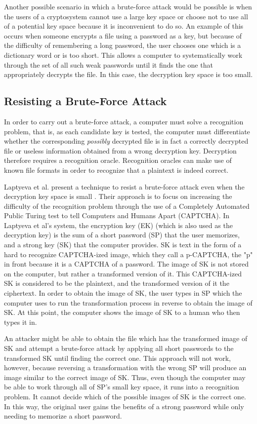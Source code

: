 \documentclass[12pt]{article}
\begin{document}
Another possible scenario in which a brute-force attack would be possible is when the users of a cryptosystem cannot use a large key space or choose not to use all of a potential key space because it is inconvenient to do so. An example of this occurs when someone encrypts a file using a password as a key, but because of the difficulty of remembering a long password, the user chooses one which is a dictionary word or is too short. This allows a computer to systematically work through the set of all such weak passwords until it finds the one that appropriately decrypts the file. In this case, the decryption key space is too small.

\subsection*{Resisting a Brute-Force Attack}
In order to carry out a brute-force attack, a computer must solve a recognition problem, that is, as each candidate key is tested, the computer must differentiate whether the corresponding \emph{possibly} decrypted file is in fact a correctly decrypted file or useless information obtained from a wrong decryption key. Decryption therefore requires a recognition oracle. Recognition oracles can make use of known file formats in order to recognize that a plaintext is indeed correct.

Laptyeva et al. present a technique to resist a brute-force attack even when the decryption key space is small \cite{laptyeva}. Their approach is to focus on increasing the difficulty of the recognition problem through the use of a Completely Automated Public Turing test to tell Computers and Humans Apart (CAPTCHA). In Laptyeva et al's system, the encryption key (EK) (which is also used as the decryption key) is the sum of a short password (SP) that the user memorizes, and a strong key (SK) that the computer provides. SK is text in the form of a hard to recognize CAPTCHA-ized image, which they call a p-CAPTCHA, the "p" in front because it is a CAPTCHA of a password. The image of SK is not stored on the computer, but rather a transformed version of it. This CAPTCHA-ized SK is considered to be the plaintext, and the transformed version of it the ciphertext. In order to obtain the image of SK, the user types in SP which the computer uses to run the transformation process in reverse to obtain the image of SK. At this point, the computer shows the image of SK to a human who then types it in.

An attacker might be able to obtain the file which has the transformed image of SK and attempt a brute-force attack by applying all short passwords to the transformed SK until finding the correct one. This approach will not work, however, because reversing a transformation with the wrong SP will produce an image similar to the correct image of SK. Thus, even though the computer may be able to work through all of SP's small key space, it runs into a recognition problem. It cannot decide which of the possible images of SK is the correct one. In this way, the original user gains the benefits of a strong password while only needing to memorize a short password.
\end{document}
